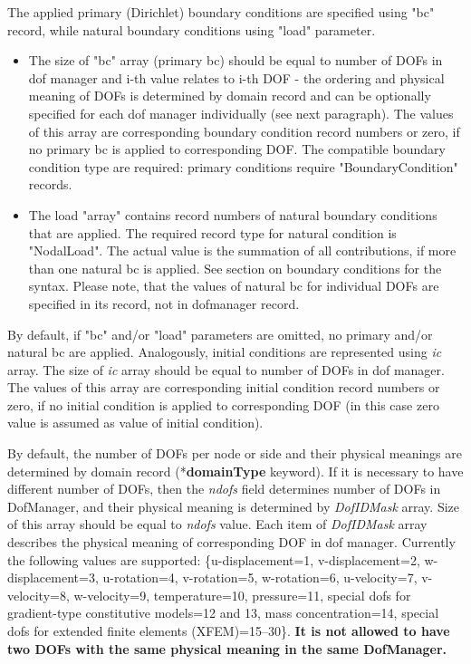 \documentclass[a4paper]{article}
\newcommand{\param}[1]{{\em #1}}
\newcommand{\entKeyword}[1]{\mbox{{*{\bf{#1}}}}}
\begin{document}
The applied primary (Dirichlet) boundary conditions are specified using
"bc" record, while natural boundary conditions using "load" parameter.
\begin{itemize}
\item The size of "bc" array (primary bc) should be equal to number of DOFs in dof manager and i-th value relates to i-th DOF - the ordering and physical meaning of DOFs is determined by domain record and can be optionally specified for each dof manager individually (see next paragraph). The values of this array are corresponding boundary condition record numbers or zero, if no primary bc is applied to corresponding DOF. The compatible boundary condition type are required: primary conditions require "BoundaryCondition" records.
\item The load "array" contains record numbers of natural boundary conditions that are applied. The required record type for natural condition is "NodalLoad". The actual value is the summation of all contributions, if more than one natural bc is applied. See section on boundary conditions for the syntax. Please note, that the values of natural bc for individual DOFs are specified in its record, not in dofmanager record.
\end{itemize}

By default, if "bc" and/or "load" parameters are omitted, no primary
and/or natural bc are applied. Analogously, initial conditions are represented using \param{ic} array. The size of \param{ic} array should be equal to number of DOFs in dof manager. The values of this array are corresponding initial condition record numbers or zero, if no initial condition is applied to corresponding DOF (in this case zero value is assumed as value of initial condition).

By default, the number of DOFs per node or side  and their physical meanings are determined by domain record (\entKeyword{domainType} keyword).
If it is necessary to have
different number of DOFs, then the \param{ndofs} field
determines number of DOFs in DofManager, and their physical meaning is
determined by \param{DofIDMask} array. Size of this array
should be equal to \param{ndofs} value. Each item of \param{DofIDMask}
array describes the physical meaning of corresponding DOF in dof manager. Currently
the following values are supported: \{u-displacement=1, v-displacement=2,
 w-displacement=3, u-rotation=4, v-ro\-ta\-tion=5, w-rotation=6, u-velocity=7, v-velocity=8, w-velocity=9,
temperature=10, pressure=11, special dofs for gradient-type constitutive models=12 and 13, mass concentration=14, special dofs for extended finite elements (XFEM)=15--30\}. {\bf It is not allowed to have two DOFs
with the same physical meaning in the same DofManager.}
\end{document}
